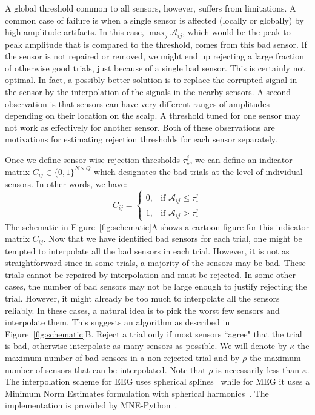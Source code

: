 A global threshold common to all sensors, however, suffers from limitations. A common case of failure is when a single sensor is affected (locally or globally) by high-amplitude artifacts. In this case, $\max_{j} \mathcal{A}_{ij}$, which would be the peak-to-peak amplitude that is compared to the threshold, comes from this bad sensor. If the sensor is not repaired or removed, we might end up rejecting a large fraction of otherwise good trials, just because of a single bad sensor. This is certainly not optimal. In fact, a possibly better solution is to replace the corrupted signal in the sensor by the interpolation of the signals in the nearby sensors. A second observation is that sensors can have very different ranges of amplitudes depending on their location on the scalp. A threshold tuned for one sensor may not work as effectively for another sensor. Both of these observations are motivations for estimating rejection thresholds for each sensor separately.

Once we define sensor-wise rejection thresholds $\tau_{\star}^{j}$, we can define an indicator matrix $C_{ij} \in \{0, 1\}^{N \times Q}$ which designates the bad trials at the level of individual sensors. In other words, we have:
\begin{equation}
C_{ij} = \begin{cases} 
0, & \text{if } \mathcal{A}_{ij} \leq \tau^{j}_{\star} \\
1, & \text{if } \mathcal{A}_{ij} > \tau^{j}_{\star}
\end{cases}
\end{equation}
The schematic in Figure~\ref{fig:schematic}A shows a cartoon figure for this indicator matrix $C_{ij}$. Now that we have identified bad sensors for each trial, one might be tempted to interpolate all the bad sensors in each trial. However, it is not as straightforward since in some trials, a majority of the sensors may be bad. These trials cannot be repaired by interpolation and must be rejected. In some other cases, the number of bad sensors may not be large enough to justify rejecting the trial. However, it might already be too much to interpolate all the sensors reliably. In these cases, a natural idea is to pick the worst few sensors and interpolate them. This suggests an algorithm as described in Figure~\ref{fig:schematic}B. Reject a trial only if most sensors ``agree" that the trial is bad, otherwise interpolate as many sensors as possible. We will denote by $\kappa$ the maximum number of bad sensors in a non-rejected trial and by $\rho$ the maximum number of sensors that can be interpolated. Note that $\rho$ is necessarily less than $\kappa$. The interpolation scheme for EEG uses spherical splines~\citep{perrin1989spherical} while for MEG it uses a Minimum Norm Estimates formulation with spherical harmonics~\citep{hamalainen1994interpreting}. The implementation is provided by MNE-Python~\citep{gramfort2013meg}.

